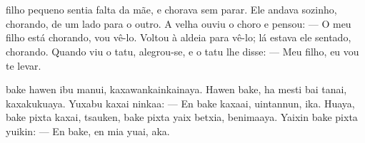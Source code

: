 \chapter*{}

\mbox{}\vspace*{\fill}



 filho pequeno sentia falta
da mãe, e chorava sem parar.
Ele andava sozinho, chorando,
de um lado para o outro.
A velha ouviu o choro e pensou:\break
--- O meu filho está chorando, vou vê-lo.
Voltou à aldeia para vê-lo; lá estava ele
sentado, chorando. Quando viu o tatu,
alegrou-se, e o tatu lhe disse:\break
--- Meu filho, eu vou te levar.

\vspace{2em}

 bake hawen ibu
manui, kaxawankainkainaya.
Hawen bake, ha mesti bai
tanai, kaxakukuaya.
Yuxabu kaxai ninkaa:\break
--- En bake kaxaai, uintannun, ika.
Huaya, bake pixta kaxai, tsauken,
bake pixta yaix betxia, benimaaya.
Yaixin bake pixta yuikin:\break
--- En bake, en mia yuai, aka.


